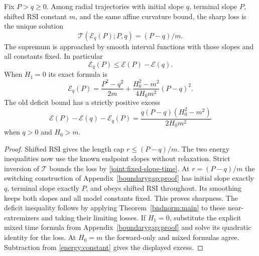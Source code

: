 \begin{proposition}
\label{joint:fixed-slope}
Fix $P>q\ge0$. Among radial trajectories with initial slope $q$,
terminal slope $P$, shifted RSI constant $m$, and the same affine
curvature bound, the sharp loss is the unique solution
\begin{equation}\label{joint:fixed-slope-time}
 \mathcal T(\mathcal E_q(P);P,q)=(P-q)/m.
\end{equation}
The supremum is approached by smooth interval functions with those
slopes and all constants fixed. In particular
\[
 \mathcal E_q(P)\le\mathcal E(P)-\mathcal E(q).
\]
When $H_1=0$ its exact formula is
\begin{equation}\label{joint:fixed-slope-constant}
 \mathcal E_q(P)=\frac{P^2-q^2}{2m}
       +\frac{H_0^2-m^2}{4H_0m^2}(P-q)^2.
\end{equation}
The old deficit bound has a strictly positive excess
\[
 \mathcal E(P)-\mathcal E(q)-\mathcal E_q(P)
   =\frac{q(P-q)(H_0^2-m^2)}{2H_0m^2}
\]
when $q>0$ and $H_0>m$.
\end{proposition}
\begin{proof}
Shifted RSI gives the length cap $r\le(P-q)/m$.
The two energy inequalities now use the known endpoint slopes
without relaxation. Strict inversion of $\mathcal T$ bounds the
loss by \eqref{joint:fixed-slope-time}.
At $r=(P-q)/m$ the switching construction of
Appendix~\ref{boundarygap:proof} has initial slope exactly $q$,
terminal slope exactly $P$, and obeys shifted RSI throughout.
Its smoothing keeps both slopes and all model constants fixed.
This proves sharpness. The deficit inequality follows by applying
Theorem~\ref{bndnorm:main} to these near-extremizers and taking
their limiting losses. If $H_1=0$, substitute the explicit mixed
time formula from Appendix~\ref{boundarygap:proof} and solve its
quadratic identity for the loss. At $H_0=m$ the forward-only and
mixed formulas agree. Subtraction from
\eqref{energy:constant} gives the displayed excess.
\end{proof}
